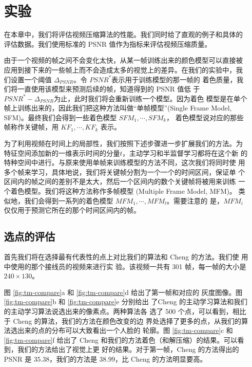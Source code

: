\chapter{实验}

在本章中，我们将评估视频压缩算法的性能。我们同时给了直观的例子和具体的
评估数据。我们使用标准的 PSNR 值作为指标来评估视频压缩质量。

由于一个视频的帧之间不会变化太快，从某一帧训练出来的颜色模型可以直接被
应用到接下来的一些帧上而不会造成太多的视觉上的差异。在我们的实验中，我
们设置一个阈值 $\Delta_{PSNR}$。令 $PSNR^{*}$表示用于训练模型的那一帧的
着色质量，我们将一直使用该模型来预测后续的帧，知道得到的 PSNR 值低
于$PSNR^{*}-\Delta_{PSNR}$为止，此时我们将会重新训练一个模型。因为着色
模型是在单个帧上训练出来的，因此我们把这种方法叫做``单帧模型''(Single
Frame Model, SFM)。最终我们会得到一些着色模型 $SFM_1, \cdots, SFM_k$，
着色模型说对应的那些帧称作关键帧，用 $KF_1, \cdots, KF_k$ 表示。

为了利用视频在时间上的局部性，我们按照下述步骤进一步扩展我们的方法。为
特征空间添加新的一维表示时间的分量$t$，主动学习和半监督学习都将在这个新
的特种空间中进行。与原来使用单帧来训练模型的方法不同，这次我们将同时使
用多个帧来学习，具体地说，我们将关键帧分割为一个一个的时间区间，保证单
个区间内的帧之间的差别不是太大，然后一个区间内的数个关键帧将被用来训练
一个着色模型。我们将这种方法称作多帧模型 (Multiple Frame Model, MFM)。
类似地，我们会得到一系列的着色模型 $MFM_1, \cdots, MFM_l$。需要注意的
是，$MFM_i$仅仅用于预测它所在的那个时间区间内的帧。

\section{选点的评估}

首先我们将在选择最有代表性的点上对比我们的算法和 Cheng 的方法。我们使
用 \cite{learning-to-compress-images} 中使用的那个接线员的视频来进行实
验。该视频一共有 301 帧，每一帧的大小是 $240 \times 130$。

图 \ref{fig:tm-compare}a 和 \ref{fig:tm-compare}d 给出了第一帧和对应的
灰度图像。图 \ref{fig:tm-compare}b 和 \ref{fig:tm-compare}e 分别给出
了Cheng 的主动学习算法和我们的主动学习算法说选出来的像素点。两种算法各
选了 500 个点，可以看到，相比于 Cheng 的算法，我们的方法在颜色改变的边
界处选择了更多的点，从我们的算法选出来的点的分布可以大致看出一个人脸的
轮廓。图 \ref{fig:tm-compare}c 和 \ref{fig:tm-compare}f 给出了 Cheng
和我们的方法着色（和解压缩）的结果。可以看到，我们的方法给出了视觉上更
好的结果。对于第一帧，Cheng 的方法得出的 PSNR 是 $35.38$，我们的方法是
$38.99$，比 Cheng 的方法明显要高。


